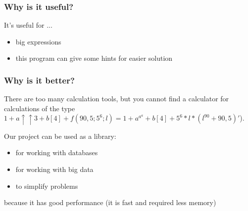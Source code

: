 \documentclass[12pt]{beamer}
\begin{document}
	\begin{frame}
		\frametitle{Why is it useful?}
		\begin{block}{It's useful for ...}
			\begin{itemize}
				\item big expressions
				\item this program can give some hints for easier solution 
			\end{itemize}
		\end{block}
	\end{frame}
	\begin{frame}
		\frametitle{Why is it better?}
			\begin{block}{There are too many calculation tools, but}
				you cannot find a calculator for calculations of the type \\ $1 + a \uparrow \uparrow 3 + b [4] + f (90,5; 5^{6}; l) = 1 + a^{a^{a}} + b [4] + 5^{6} * l * (l^{90} + 90,5)'$).
			\end{block}
			\begin{block}{}
				Our project can be used as a library:
				\begin{itemize}
					\item for working with databases
					\item for working with big data
					\item to simplify problems
				\end{itemize}
				because it has good performance (it is fast and required less memory)
			\end{block}
		\end{frame}
\end{document}
